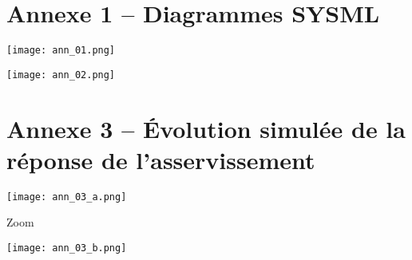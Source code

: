 \section*{Annexe 1 -- Diagrammes SYSML}

\begin{center}
\texttt{[image: ann\_01.png]}

\texttt{[image: ann\_02.png]}
\end{center}

%


\section*{Annexe 3 -- Évolution simulée de la réponse de l'asservissement}

\begin{center}
\texttt{[image: ann\_03\_a.png]}

\vspace{1cm}

Zoom

\vspace{1cm}

\texttt{[image: ann\_03\_b.png]}
\end{center}

%
%
%
